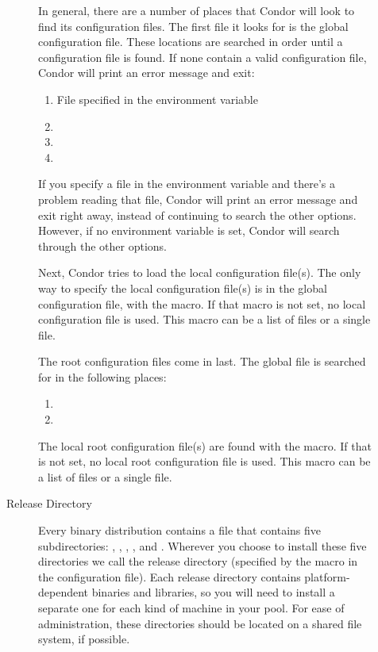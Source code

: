 \begin{description}
\begin{description}
In general, there are a number of places that Condor will look to find
its configuration files.  The first file it looks for is the global configuration
file.  These locations are searched in order until a configuration file is
found.  If none contain a valid configuration file, Condor will print an
error message and exit:
\begin{enumerate}
   \item File specified in the  environment variable
   \item {}
   \item {}
   \item {}
\end{enumerate}

If you specify a file in the  environment variable
and there's a problem reading that file, Condor will print an error
message and exit right away, instead of continuing to search the other
options.
However, if no  environment variable is set,
Condor will search through the other options.

Next, Condor tries to load the local configuration file(s).
The only way to specify the local configuration file(s) is in the global configuration
file, with the  macro.  If that macro is not
set, no local configuration file is used.  This macro can be a list of files
or a single file.

The root configuration files come in last.  The global file is searched for
in the following places:
\begin{enumerate}
   \item {}
   \item {}
\end{enumerate}

The local root configuration file(s) are found with the
 macro.  If that is not set, no local
root configuration file is used.  This
macro can be a list of files or a single file.

\item[Release Directory]

Every binary distribution contains a  file that contains
five subdirectories: , , , ,
and . Wherever you
choose to install these five directories we call the release directory
(specified by the  macro in the configuration file).
Each
release directory contains platform-dependent binaries and libraries,
so you will need to install a separate one for each kind of machine in
your pool.  For ease of administration, these directories should be
located on a shared file system, if possible.


\end{description}
\end{description}
